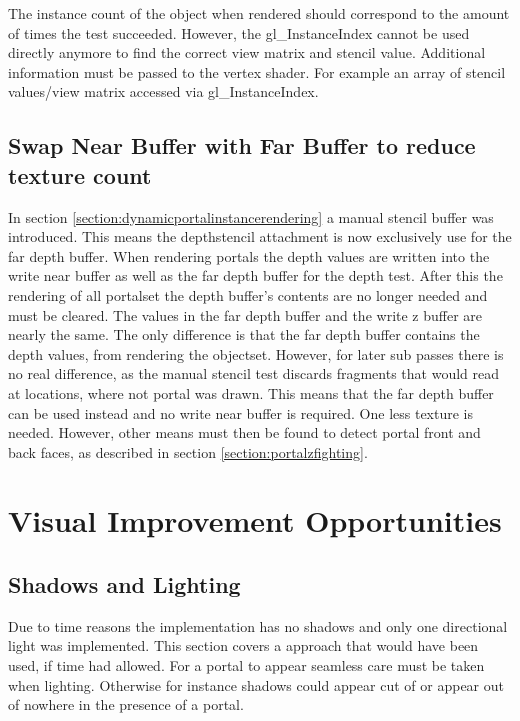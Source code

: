 The instance count of the object when rendered should correspond to the amount of times the  test succeeded. However, the gl\_InstanceIndex cannot be used directly anymore to find the correct view matrix and stencil value. Additional information must be passed to the vertex shader. For example an array of stencil values/view matrix accessed via gl\_InstanceIndex.

\subsection{Swap Near Buffer with Far Buffer to reduce texture count}

In section \ref{section:dynamicportalinstancerendering} a manual stencil buffer was introduced. This means the depthstencil attachment is now exclusively use for the far depth buffer. When rendering portals the depth values are written into the write near buffer as well as the far depth buffer for the depth test. After this the rendering of all \gls{portalset} the depth buffer's contents are no longer needed and must be cleared. The values in the far depth buffer and the write z buffer are nearly the same. The only difference is that the far depth buffer contains the depth values, from rendering the \gls{objectset}. However, for later sub passes there is no real difference, as the manual stencil test discards fragments that would read at locations, where not portal was drawn. This means that the far depth buffer can be used instead and no write near buffer is required. One less texture is needed. However, other means must then be found to detect portal front and back faces, as described in section \ref{section:portalzfighting}.

\section{Visual Improvement Opportunities}

\subsection{Shadows and Lighting}
Due to time reasons the implementation has no shadows and only one directional light was implemented. This section covers a approach that would have been used, if time had allowed. For a portal to appear seamless care must be taken when lighting. Otherwise for instance shadows could appear cut of or appear out of nowhere in the presence of a portal.

